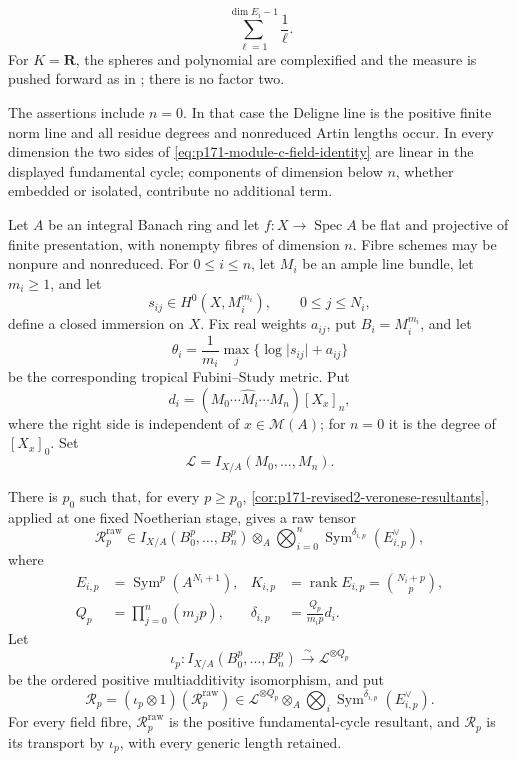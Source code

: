 \begin{lemma}
\begin{enumerate}
\begin{equation}
       \sum_{\ell=1}^{\dim E_i-1}\frac1\ell.
 \label{eq:p171-module-c-powered-arch}
\end{equation}
For \(K=\mathbf R\), the spheres and polynomial are complexified and the
measure is pushed forward as in \cite[Remark~8.1]{BE21}; there is no factor
two.
\end{enumerate}
The assertions include \(n=0\).  In that case the Deligne line is the
positive finite norm line and all residue degrees and nonreduced Artin
lengths occur.  In every dimension the two sides of
\eqref{eq:p171-module-c-field-identity} are linear in the displayed
fundamental cycle; components of dimension below \(n\), whether embedded
or isolated, contribute no additional term.
\end{lemma}

\begin{theorem}
\label{thm:p171-module-c-synchronized-comparison}
Let \(A\) be an integral Banach ring and let
\(f:X\to\operatorname{Spec}A\) be flat and projective of finite
presentation, with nonempty fibres of dimension \(n\).  Fibre schemes may
be nonpure and nonreduced.  For \(0\leq i\leq n\), let \(M_i\) be an ample
line bundle, let \(m_i\geq1\), and let
\[
 s_{ij}\in H^0(X,M_i^{m_i}),\qquad 0\leq j\leq N_i,
\]
define a closed immersion on \(X\).  Fix real weights \(a_{ij}\), put
\(B_i=M_i^{m_i}\), and let
\[
 \theta_i=\frac1{m_i}\max_j\{\log\lvert s_{ij}\rvert+a_{ij}\}
\]
be the corresponding tropical Fubini--Study metric.  Put
\[
 d_i=(M_0\cdots\widehat M_i\cdots M_n)[X_x]_n,
\]
where the right side is independent of \(x\in\mathcal M(A)\); for \(n=0\)
it is the degree of \([X_x]_0\).  Set
\[
 \mathscr L=I_{X/A}(M_0,\ldots,M_n).
\]

There is \(p_0\) such that, for every \(p\geq p_0\),
\cref{cor:p171-revised2-veronese-resultants}, applied at one fixed
Noetherian stage, gives a raw tensor
\begin{equation}
 \mathcal R_p^{\mathrm{raw}}\in
 I_{X/A}(B_0^p,\ldots,B_n^p)\otimes_A
 \bigotimes_{i=0}^n\operatorname{Sym}^{\delta_{i,p}}(E_{i,p}^\vee),
 \label{eq:p171-module-c-relative-tensor}
\end{equation}
where
\begin{align}
 E_{i,p}&=\operatorname{Sym}^p(A^{N_i+1}),&
 K_{i,p}&=\operatorname{rank}E_{i,p}=\binom{N_i+p}{p},
 \label{eq:p171-module-c-veronese-module}\\
 Q_p&=\prod_{j=0}^n(m_jp),&
 \delta_{i,p}&=\frac{Q_p}{m_ip}d_i.
 \label{eq:p171-module-c-powers}
\end{align}
Let
\begin{equation}
 \iota_p:I_{X/A}(B_0^p,\ldots,B_n^p)
 \xrightarrow{\sim}\mathscr L^{\otimes Q_p}
 \label{eq:p171-module-c-line-power}
\end{equation}
be the ordered positive multiadditivity isomorphism, and put
\[
 \mathcal R_p=(\iota_p\otimes1)(\mathcal R_p^{\mathrm{raw}})
 \in\mathscr L^{\otimes Q_p}\otimes_A
 \bigotimes_i\operatorname{Sym}^{\delta_{i,p}}(E_{i,p}^\vee).
\]
For every field fibre, \(\mathcal R_p^{\mathrm{raw}}\) is the positive
fundamental-cycle resultant, and \(\mathcal R_p\) is its transport by
\(\iota_p\), with every generic length retained.


\end{theorem}
